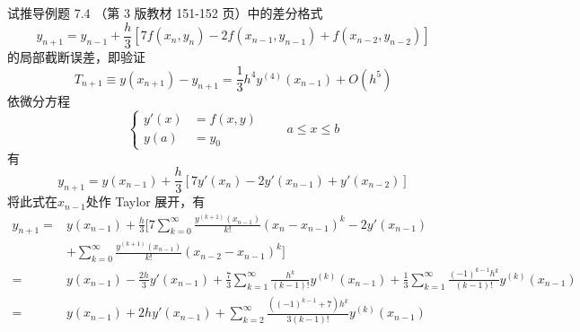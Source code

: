\documentclass[11pt]{article}
\begin{document}
\maketitle

\thispagestyle{empty}

\newpage

\begin{question}

    \questiontext
    {
        试推导例题 7.4 （第 3 版教材 151-152 页）中的差分格式
        $$
            y_{n + 1} = y_{n - 1} + \frac{h}{3}\left[7f(x_{n}, y_{n}) - 2f(x_{n - 1}, y_{n - 1}) + f(x_{n - 2}, y_{n - 2})\right]
        $$
        的局部截断误差，即验证
        \begin{equation*}
            T_{n + 1} \equiv y(x_{n + 1}) - y_{n + 1} = \frac{1}{3}h^4y^{(4)}(x_{n - 1}) + O(h^5)
        \end{equation*}
    }
    \answer
    {
        依微分方程
        \begin{equation*}
            \left\{
            \begin{aligned}
                y'(x) & = f(x, y) \\
                y(a)  & = y_0
            \end{aligned}
            \right.
            \qquad a \leqslant x \leqslant b
        \end{equation*}
        有
        \begin{equation*}
            y_{n + 1} = y(x_{n - 1}) + \frac{h}{3}\left[7y'(x_{n}) - 2y'(x_{n - 1}) + y'(x_{n - 2})\right]
        \end{equation*}
        将此式在$x_{n - 1}$处作 Taylor 展开，有
        \begin{align*}
            y_{n + 1} = & y(x_{n - 1}) + \frac{h}{3}\Bigg[7\sum_{k = 0}^{\infty}\frac{y^{(k + 1)}(x_{n - 1})}{k!}(x_{n    } - x_{n - 1})^k - 2y'(x_{n - 1})                                                                      \\
                        & + \sum_{k = 0}^{\infty}\frac{y^{(k + 1)}(x_{n - 1})}{k!}(x_{n - 2} - x_{n - 1})^k\Bigg]                                                                                                                \\
            =           & y(x_{n - 1}) - \frac{2h}{3}y'(x_{n - 1}) + \frac{7}{3}\sum_{k = 1}^{\infty}\frac{h^k}{(k - 1)!}y^{(k)}(x_{n - 1}) + \frac{1}{3}\sum_{k = 1}^{\infty}\frac{(-1)^{k - 1}h^k}{(k - 1)!}y^{(k)}(x_{n - 1}) \\
            =           & y(x_{n - 1}) + 2hy'(x_{n - 1}) + \sum_{k = 2}^{\infty}\frac{\left((-1)^{k - 1} + 7\right)h^k}{3(k - 1)!}y^{(k)}(x_{n - 1})

\end{align*}}
\end{question}
\end{document}
